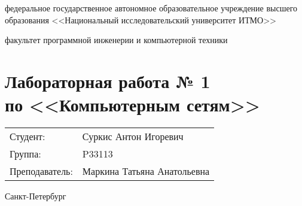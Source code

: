 \begin{titlepage}
    \begin{center}
        федеральное государственное автономное образовательное учреждение высшего образования
        <<Национальный исследовательский университет ИТМО>>

        \bigskip

        факультет программной инженерии и компьютерной техники

        \vfill

        \section*{Лабораторная работа № 1 \\
        по <<Компьютерным сетям>>}

        \bigskip

        \begin{flushright}
            \begin{tabular}{ll}
                Студент: & Суркис Антон Игоревич \\
                Группа: & P33113 \\
                Преподаватель: & Маркина Татьяна Анатольевна \\
            \end{tabular}
        \end{flushright}

        \vfill

        Санкт-Петербург

        \the\year
    \end{center}
\end{titlepage}
